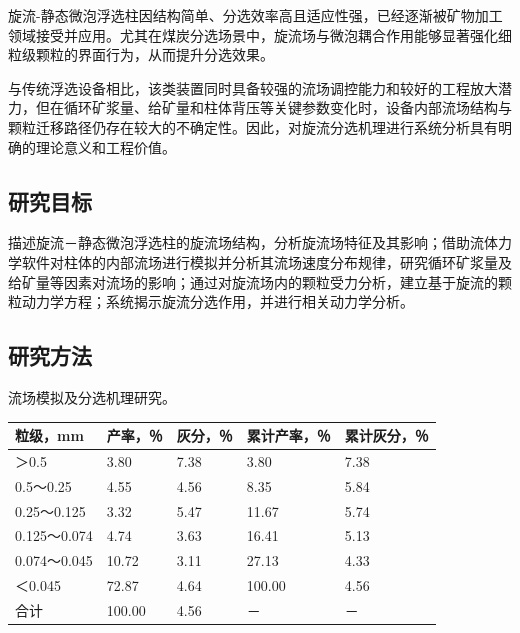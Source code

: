\label{page:body-first}
\label{chap:intro}


旋流-静态微泡浮选柱因结构简单、分选效率高且适应性强，已经逐渐被矿物加工领域接受并应用。尤其在煤炭分选场景中，旋流场与微泡耦合作用能够显著强化细粒级颗粒的界面行为，从而提升分选效果。

\vspace{0.5\baselineskip}

与传统浮选设备相比，该类装置同时具备较强的流场调控能力和较好的工程放大潜力，但在循环矿浆量、给矿量和柱体背压等关键参数变化时，设备内部流场结构与颗粒迁移路径仍存在较大的不确定性。因此，对旋流分选机理进行系统分析具有明确的理论意义和工程价值。

\subsection{研究目标}

描述旋流－静态微泡浮选柱的旋流场结构，分析旋流场特征及其影响；借助流体力学软件对柱体的内部流场进行模拟并分析其流场速度分布规律，研究循环矿浆量及给矿量等因素对流场的影响；通过对旋流场内的颗粒受力分析，建立基于旋流的颗粒动力学方程；系统揭示旋流分选作用，并进行相关动力学分析。

\clearpage
{}
\label{page:body-second}

\subsection{研究方法}

\noindent 流场模拟及分选机理研究。

\begin{table}[H]
    \centering
    \label{tab:sieve}
    \renewcommand{\arraystretch}{1.16}
    \begin{tabular}{C{2.20cm}C{1.80cm}C{1.80cm}C{2.20cm}C{2.20cm}}
        \toprule
        粒级，mm & 产率，％ & 灰分，％ & 累计产率，％ & 累计灰分，％ \\
        \midrule
        ＞0.5 & 3.80 & 7.38 & 3.80 & 7.38 \\
        0.5～0.25 & 4.55 & 4.56 & 8.35 & 5.84 \\
        0.25～0.125 & 3.32 & 5.47 & 11.67 & 5.74 \\
        0.125～0.074 & 4.74 & 3.63 & 16.41 & 5.13 \\
        0.074～0.045 & 10.72 & 3.11 & 27.13 & 4.33 \\
        ＜0.045 & 72.87 & 4.64 & 100.00 & 4.56 \\
        合计 & 100.00 & 4.56 & － & － \\
        \bottomrule
    \end{tabular}
\end{table}

